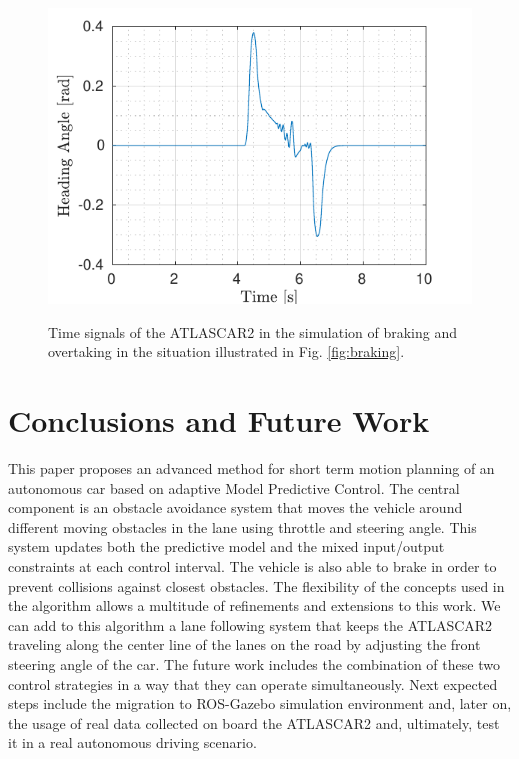 \documentclass[conference,11pt]{IEEEtran}
\begin{document}
\begin{figure}[!t]
\begin{minipage}[t]{\columnwidth}
	    \vspace{-17pt}
	    \subcaption{}\label{fig:delta_braking}
	\end{minipage}
	\hfill
	\begin{minipage}[t]{\columnwidth}
	    \includegraphics[width=\columnwidth,height=0.5\columnwidth]{./figure/three_obstacles_no_overtaking/HeadingAngleVsTime.pdf}
	    \vspace{-17pt}
	    \subcaption{}\label{fig:theta_braking}
	\end{minipage}
	\caption{Time signals of the ATLASCAR2 in the simulation of braking and overtaking in the situation illustrated in Fig. \ref{fig:braking}.}
	\label{fig:components}
\end{figure}

\section{Conclusions and Future Work}
This paper proposes an advanced method for short term motion planning of an autonomous car based on adaptive Model Predictive Control. The central component is an obstacle avoidance system that moves the vehicle around different moving obstacles in the lane using throttle and steering angle. This system updates both the predictive model and the mixed input/output constraints at each control interval. The vehicle is also able to brake in order to prevent collisions against closest obstacles.
The flexibility of the concepts used in the algorithm allows a multitude of refinements and extensions to this work. We can add to this algorithm a lane following system that keeps the ATLASCAR2 traveling along the center line of the lanes on the road by adjusting the front steering angle of the car. The future work includes the combination of these two control strategies in a way that they can operate simultaneously. Next expected steps include the migration to ROS-Gazebo simulation environment and, later on, the usage of real data collected on board the ATLASCAR2 and, ultimately, test it in a real autonomous driving scenario.
\end{document}
